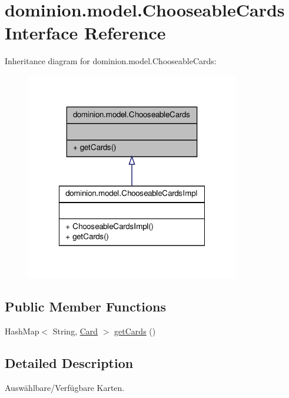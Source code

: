 \hypertarget{interfacedominion_1_1model_1_1ChooseableCards}{\section{dominion.\-model.\-Chooseable\-Cards \-Interface \-Reference}
\label{interfacedominion_1_1model_1_1ChooseableCards}
}


\-Inheritance diagram for dominion.\-model.\-Chooseable\-Cards\-:
\nopagebreak
\begin{figure}[H]
\begin{center}
\leavevmode
\includegraphics[width=264pt]{interfacedominion_1_1model_1_1ChooseableCards__inherit__graph}
\end{center}
\end{figure}
\subsection*{\-Public \-Member \-Functions}
\begin{DoxyCompactItemize}
\item 
\-Hash\-Map$<$ \-String, \hyperlink{interfacedominion_1_1model_1_1cards_1_1Card}{\-Card} $>$ \hyperlink{interfacedominion_1_1model_1_1ChooseableCards_a29c97216e32a2d40003c31f94632ac02}{get\-Cards} ()
\end{DoxyCompactItemize}


\subsection{\-Detailed \-Description}
\-Auswählbare/\-Verfügbare \-Karten.

